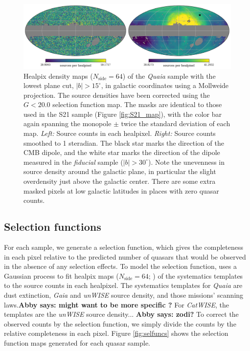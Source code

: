 \documentclass[modern]{aastex631}
\newcommand{\abby}[1]{\textbf{Abby says: #1}}
\newcommand{\catwise}{\textsl{CatWISE}\xspace}
\newcommand{\quaia}{\textsl{Quaia}\xspace}
\newcommand{\gaia}{\textsl{Gaia}\xspace}
\newcommand{\unwise}{\textsl{unWISE}\xspace}
\begin{document}
\begin{figure}
    \centering
    \includegraphics[width=\textwidth]{images/quaia_map.png}
    \caption{Healpix density maps ($N_\mathrm{side}=64$) of the \quaia sample with the lowest plane cut, $|b|>15^\circ$, in galactic coordinates using a Mollweide projection. The source densities have been corrected using the $G<20.0$ selection function map. The masks are identical to those used in the S21 sample (Figure \ref{fig:S21_map}), with the color bar again spanning the monopole $\pm$ twice the standard deviation of each map. \textit{Left:} Source counts in each healpixel. \textit{Right:} Source counts smoothed to 1 steradian. The black star marks the direction of the CMB dipole, and the white star marks the direction of the dipole measured in the \textit{fiducial} sample ($|b|>30^\circ$). Note the unevenness in source density around the galactic plane, in particular the slight overdensity just above the galactic center. There are some extra masked pixels at low galactic latitudes in places with zero quasar counts.}
    \label{fig:quaia_map}
\end{figure}


\subsection{Selection functions}
\label{sec:selfuncs}
For each sample, we generate a selection function, which gives the completeness in each pixel relative to the predicted number of quasars that would be observed in the absence of any selection effects.
To model the selection function, \cite{storey-fisher_quaia_2023} uses a Gaussian process to fit healpix maps ($N_\mathrm{side}=64$; \citealt{gorski_healpix_2005}) of the systematics templates to the source counts in each healpixel.
The systematics templates for \quaia are dust extinction, \gaia and \unwise source density, and those missions' scanning laws.\abby{might want to be more specific ?}
For \catwise, the templates are the \unwise source density... \abby{zodi?}
To correct the observed counts by the selection function, we simply divide the counts by the relative completeness in each pixel.
Figure \ref{fig:selfuncs} shows the selection function maps generated for each quasar sample.
\end{document}
